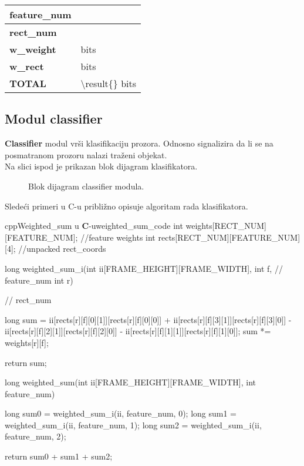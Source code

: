 \begin{center}
  \centering
   \label{feature_mem_size}
    \begin{tabular}{| P{3.0cm} | P{3.0cm}|}
    \hline
     \textbf{feature\_num} & \featureNum{}  \\ \hline
     \textbf{rect\_num} & \rectNum{}  \\ \hline
     \textbf{w\_weight} & \wWeight{} bits  \\ \hline
     \textbf{w\_rect} & \wRect{} bits  \\ \hline
       \textbf{TOTAL} &  \num[group-separator={,}]{\result{}} bits \\ \hline
    \end{tabular}
\end{center}

\newpage

\subsection{Modul classifier}

\textbf{Classifier} modul vrši klasifikaciju prozora.
Odnosno signalizira da li se na posmatranom prozoru nalazi traženi objekat.\\

Na slici ispod je prikazan blok dijagram klasifikatora.\\

\begin{figure}[H]
  \centering
  \resizebox{0.9\textwidth}{!}{%
    
    }
\caption{Blok dijagram classifier modula.}
\label{classifier_bd}
\end{figure}

\newpage

Sledeći primeri u C-u približno opisuje algoritam rada klasifikatora.

\begin{code}[H]{cpp}{Weighted\_sum u \textbf{C}-u}{weighted_sum_code}
int weights[RECT_NUM][FEATURE_NUM];           //feature weights
int rects[RECT_NUM][FEATURE_NUM][4];          //unpacked rect_coords

long weighted_sum_i(int ii[FRAME_HEIGHT][FRAME_WIDTH],
                    int f,                    // feature_num
                    int r){                   // rect_num

  long sum = ii[rects[r][f][0][1]][rects[r][f][0][0]] +
             ii[rects[r][f][3][1]][rects[r][f][3][0]] -
             ii[rects[r][f][2][1]][rects[r][f][2][0]] -
             ii[rects[r][f][1][1]][rects[r][f][1][0]];
  sum *= weights[r][f];

  return sum;
}
long weighted_sum(int ii[FRAME_HEIGHT][FRAME_WIDTH],
                  int feature_num){
  long sum0 = weighted_sum_i(ii, feature_num, 0);
  long sum1 = weighted_sum_i(ii, feature_num, 1);
  long sum2 = weighted_sum_i(ii, feature_num, 2);

  return sum0 + sum1 + sum2;
}
\end{code}

